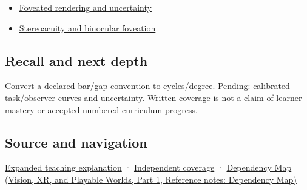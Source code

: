 \hypertarget{appendix-b491fc48c54b-used-by}{}

\begin{itemize}
\tightlist
\item
  \hyperref[appendix-5878b813b732]{Foveated rendering and uncertainty}
\item
  \hyperref[appendix-8dc848f14052]{Stereoacuity and binocular foveation}
\end{itemize}

\subsection{Recall and next depth}\label{appendix-b491fc48c54b-recall-and-next-depth}

\hypertarget{appendix-b491fc48c54b-recall-and-next-depth}{}

Convert a declared bar/gap convention to cycles/degree. Pending: calibrated task/observer curves and uncertainty. Written coverage is not a claim of learner mastery or accepted numbered-curriculum progress.

\subsection{Source and navigation}\label{appendix-b491fc48c54b-source-and-navigation}

\hypertarget{appendix-b491fc48c54b-source-and-navigation}{}

\hyperref[04-visual-computing-ii-ch042-visibility-is-about-contrast-conditions-and-tasks]{Expanded teaching explanation} · \hyperref[appendix-fd090d982a15-xr01---independent-seeing-and-representation-source]{Independent coverage} · \href{../07-Vision-XR-and-Playable-Worlds-P01/main.pdf\#appendix-4ad47bdd269a}{Dependency Map (Vision, XR, and Playable Worlds, Part 1, Reference notes: Dependency Map)}
